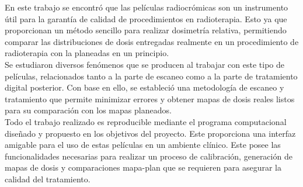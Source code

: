 En este trabajo se encontró que las películas radiocrómicas son un instrumento útil para la garantía de calidad de procedimientos en radioterapia. Esto ya que proporcionan un método sencillo para realizar dosimetría relativa, permitiendo comparar las distribuciones de dosis entregadas realmente en un procedimiento de radioterapia con la planeadas en un principio.\\

Se estudiaron diversos fenómenos que se producen al trabajar con este tipo de películas, relacionados tanto a la parte de escaneo como a la parte de tratamiento digital posterior. Con base en ello, se estableció una metodología de escaneo y tratamiento que permite minimizar errores y obtener mapas de dosis reales listos para su comparación con los mapas planeados.\\

Todo el trabajo realizado es reproducible mediante el programa computacional diseñado y propuesto en los objetivos del proyecto. Este proporciona una interfaz amigable para el uso de estas películas en un ambiente clínico. Este posee las funcionalidades necesarias para realizar un proceso de calibración, generación de mapas de dosis y comparaciones mapa-plan que se requieren para asegurar la calidad del tratamiento.\\